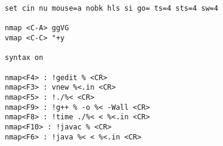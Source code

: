 \begin{lstlisting}
set cin nu mouse=a nobk hls si go= ts=4 sts=4 sw=4

nmap <C-A> ggVG
vmap <C-C> "+y

syntax on

nmap<F4> : !gedit % <CR>
nmap<F3> : vnew %<.in <CR>
nmap<F5> : !./%< <CR>
nmap<F9> : !g++ % -o %< -Wall <CR>
nmap<F8> : !time ./%< < %<.in <CR>
nmap<F10> : !javac % <CR>
nmap<F6> : !java %< < %<.in <CR>
\end{lstlisting}
